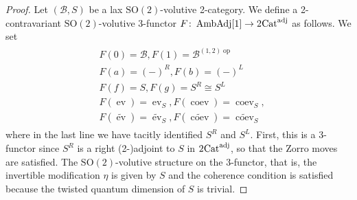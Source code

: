\documentclass{article}
\newcommand{\opp}{\operatorname{op}}%
\newcommand{\ev}{\operatorname{ev}}%
\newcommand{\coev}{\operatorname{coev}}%
\newcommand{\Cat}{\operatorname{Cat}}%
\newcommand{\AmAdj}{\operatorname{AmbAdj}}%
\newcommand{\Sotwo}{\operatorname{SO(2)}}
\newcommand{\B}{\mathcal{B}}
\numberwithin{equation}{section}
\theoremstyle{definition}
\theoremstyle{theorem}
\begin{document}
\begin{proof}
    Let $(\B,S)$ be a lax $\Sotwo$-volutive 2-category. We define a 2-contravariant $\Sotwo$-volutive 3-functor 
    $F \colon \AmAdj[1] \to 2\hspace{-0.05cm}\Cat^{\operatorname{adj}}$ as follows. We set 
    \begin{align}
        \begin{aligned}
            &F(0) = \B, F(1) = \B^{(1,2)\opp} \\
            &F(a) = (-)^R, F(b) = (-)^L \\
            &F(f) = S, F(g) = S^R \cong S^L\\
            &F(\ev) = \ev_S, F(\coev) = \coev_S, \\
            &F(\widetilde{\ev}) = \widetilde{\ev}_{S}, F(\widetilde{\coev}) = \widetilde{\coev}_S
        \end{aligned}
    \end{align} 
    where in the last line we have tacitly identified $S^R$ and $S^L$. 
    First, this is a 3-functor since $S^R$ is a right (2-)adjoint to $S$ in $2\hspace{-0.05cm}\Cat^{\operatorname{adj}}$, so that the Zorro moves are satisfied. 
    The $\Sotwo$-volutive structure on the 3-functor, that is, the invertible modification $\eta$ is given by $S$ and the coherence condition is satisfied 
    because the twisted quantum dimension of $S$ is trivial. 
\end{proof}
\end{document}
